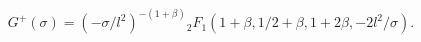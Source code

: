 \begin{equation}
G^+(\sigma)= (-\sigma/l^2)^{-(1+\beta)} {}_2 F_1(
1+\beta,1/2+\beta,1+2\beta, -2l^2/\sigma).
\end{equation}

